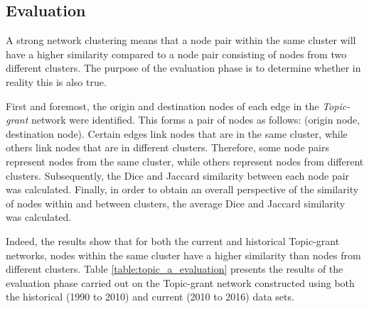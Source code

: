 \subsection{Evaluation}

A strong network clustering means that a node pair within the same cluster will have a higher similarity compared to a node pair consisting of nodes from two different clusters. The purpose of the evaluation phase is to determine whether in reality this is also true.

First and foremost, the origin and destination nodes of each edge in the \textit{Topic-grant} network were identified. This forms a pair of nodes as follows: (origin node, destination node). Certain edges link nodes that are in the same cluster, while others link nodes that are in different clusters. Therefore, some node pairs represent nodes from the same cluster, while others represent nodes from different clusters. Subsequently, the Dice and Jaccard similarity between each node pair was calculated. Finally, in order to obtain an overall perspective of the similarity of nodes within and between clusters, the average Dice and Jaccard similarity was calculated. 

Indeed, the results show that for both the current and historical Topic-grant networks, nodes within the same cluster have a higher similarity than nodes from different clusters. Table \ref{table:topic_a_evaluation} presents the results of the evaluation phase carried out on the Topic-grant network constructed using both the historical (1990 to 2010) and current (2010 to 2016) data sets.


